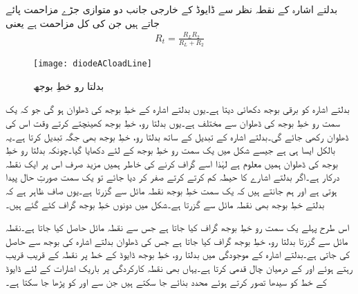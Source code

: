 بدلتے اشارہ کے نقطہ نظر سے ڈایوڈ کے خارجی جانب دو متوازی جڑے مزاحمت پائے جاتے ہیں جن کی کل مزاحمت   ہے یعنی
\begin{align}
R_t= \frac{R_L R_2}{R_L+R_2}
\end{align}
%
\begin{figure}
\centering
\texttt{[image: diodeACloadLine]}
\caption{بدلتا رو خطِ بوجھ}
\label{شکل_ڈایوڈ_بدلتا_بار_کا_خط}
\end{figure}
بدلتے اشارہ کو  برقی بوجھ دکھائی دیتا ہے۔یوں بدلتے اشارہ کے خطِ بوجھ کی ڈھلوان  ہو گی جو کہ یک سمت رو خطِ بوجھ کی ڈھلوان سے مختلف ہے۔یوں بدلتا رو، خطِ بوجھ کھینچتے کرتے وقت اس کی ڈھلوان  رکھی جائے گی۔بدلتے اشارہ کے تبدیل کے ساتھ  بدلتا رو، خطِ بوجھ بھی جگہ تبدیل کرتا ہے۔یہ بالکل ایسا ہی ہے جیسے شکل   میں یک سمت رو خطِ بوجھ کے لئے دکھایا گیا۔چونکہ بدلتا رو خطِ بوجھ کی ڈھلوان ہمیں معلوم ہے لہٰذا اسے گراف کرنے کی خاطر ہمیں مزید صرف اس پر ایک نقطہ درکار ہے۔اگر بدلتے اشارے کا حیطہ کم کرتے کرتے صفر کر دیا جائے تو یک سمت صورتِ حال پیدا ہوتی ہے اور ہم جانتے ہیں کہ یک سمت خطِ بوجھ نقطہ مائل سے گزرتا ہے۔یوں صاف ظاہر ہے کہ بدلتے خطِ بوجھ بھی نقطہ مائل سے گزرتا ہے۔شکل  میں دونوں خطِ بوجھ گراف کئے گئے ہیں۔

اس طرح پہلے یک سمت رو خطِ بوجھ گراف کیا جاتا ہے جس سے نقطہ مائل حاصل کیا جاتا ہے۔نقطہ مائل سے گزرتا بدلتا رو، خطِ بوجھ گراف کیا جاتا ہے جس کی ڈھلوان بدلتے اشارہ کی  بوجھ سے حاصل کی جاتی ہے۔بدلتے اشارہ کے موجودگی میں بدلتا رو، خطِ بوجھ ڈایوڈ کے خط پر نقطہ  کے قریب قریب رہتے ہوئے   اور  کے درمیان چال قدمی کرتا ہے۔یہاں بھی نقطہ کارکردگی پر باریک اشارات کے لئے ڈایوڈ کے خط کو سیدھا تصور کرتے ہوئے محدد  بنائے جا سکتے ہیں جن سے اور  کو پڑھا جا سکتا ہے۔

